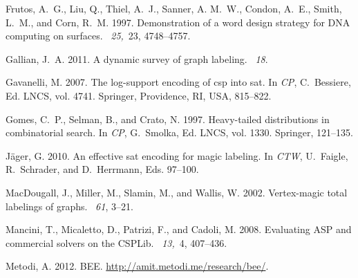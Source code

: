 \documentclass{tlp}
\newcommand{\bee}{\textsf{BEE}}
\begin{document}
\begin{thebibliography}{}
{\sc Frutos, A.~G.}, {\sc Liu, Q.}, {\sc Thiel, A.~J.}, {\sc Sanner, A. M.~W.},
  {\sc Condon, A.~E.}, {\sc Smith, L.~M.}, {\sc and} {\sc Corn, R.~M.} 1997.
\newblock Demonstration of a word design strategy for {DNA} computing on
  surfaces.
~{\em 25,\/}~23, 4748--4757.

{\sc Gallian, J.~A.} 2011.
\newblock A dynamic survey of graph labeling.
~{\em 18}.

{\sc Gavanelli, M.} 2007.
\newblock The log-support encoding of csp into sat.
\newblock In {\em CP}, {C.~Bessiere}, Ed. LNCS, vol. 4741. Springer,
  Providence, RI, USA, 815--822.

{\sc Gomes, C.~P.}, {\sc Selman, B.}, {\sc and} {\sc Crato, N.} 1997.
\newblock Heavy-tailed distributions in combinatorial search.
\newblock In {\em CP}, {G.~Smolka}, Ed. LNCS, vol. 1330. Springer, 121--135.

{\sc J{\"a}ger, G.} 2010.
\newblock An effective sat encoding for magic labeling.
\newblock In {\em CTW}, {U.~Faigle}, {R.~Schrader}, {and} {D.~Herrmann}, Eds.
  97--100.

{\sc MacDougall, J.}, {\sc Miller, M.}, {\sc Slamin, M.}, {\sc and} {\sc
  Wallis, W.} 2002.
\newblock Vertex-magic total labelings of graphs.
~{\em 61}, 3--21.

{\sc Mancini, T.}, {\sc Micaletto, D.}, {\sc Patrizi, F.}, {\sc and} {\sc
  Cadoli, M.} 2008.
\newblock Evaluating {ASP} and commercial solvers on the {CSPLib}.
~{\em 13,\/}~4, 407--436.

{\sc Metodi, A.} 2012.
\newblock \bee.
\newblock \url{http://amit.metodi.me/research/bee/}.


\end{thebibliography}
\end{document}

